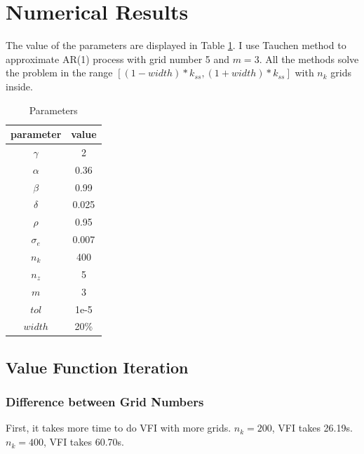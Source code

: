 \documentclass{article}
\begin{document}
	\section{Numerical Results}
	
	The value of the parameters are displayed in Table \ref{tab:param}.
	I use Tauchen method to approximate AR(1) process with grid number 5 and $m=3$.
	All the methods solve the problem in the range $[(1-width)*k_{ss},(1+width)*k_{ss}]$ with $n_k$ grids inside.
	\begin{table}[H]
		\centering
		\begin{tabular}{|c|c|}
			parameter & value \\ \hline
			$\gamma$ & 2\\
			$\alpha$ & 0.36\\
			$\beta$ & 0.99\\
			$\delta$ & 0.025\\
			$\rho$ & 0.95\\
			$\sigma_e$ & 0.007\\
			$n_k$ & 400\\
			$n_z$ & 5\\
			$m$ & 3\\
			$tol$ & 1e-5\\
			$width$ & 20\%
		\end{tabular}
		\caption{Parameters}
		\label{tab:param}
	\end{table}
	
	\subsection{Value Function Iteration}
	
	\subsubsection{Difference between Grid Numbers}
	
	First, it takes more time to do VFI with more grids.
	$n_k=200$, VFI takes 26.19s.
	$n_k=400$, VFI takes 60.70s.
	
\end{document}
